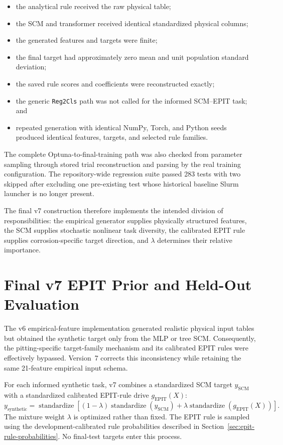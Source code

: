 \documentclass{article}
\begin{document}
\begin{itemize}
    \item the analytical rule received the raw physical table;
    \item the SCM and transformer received identical standardized physical
    columns;
    \item the generated features and targets were finite;
    \item the final target had approximately zero mean and unit population
    standard deviation;
    \item the saved rule scores and coefficients were reconstructed exactly;
    \item the generic \texttt{Reg2Cls} path was not called for the informed
    SCM--EPIT task; and
    \item repeated generation with identical NumPy, Torch, and Python seeds
    produced identical features, targets, and selected rule families.
\end{itemize}

The complete Optuna-to-final-training path was also checked from parameter
sampling through stored trial reconstruction and parsing by the real training
configuration. The repository-wide regression suite passed 283 tests with two
skipped after excluding one pre-existing test whose historical baseline Slurm
launcher is no longer present.

The final v7 construction therefore implements the intended division of
responsibilities: the empirical generator supplies physically structured
features, the SCM supplies stochastic nonlinear task diversity, the calibrated
EPIT rule supplies corrosion-specific target direction, and
\(\lambda\) determines their relative importance.


\section{Final v7 EPIT Prior and Held-Out Evaluation}
\label{sec:final-v7-results}

The v6 empirical-feature implementation generated realistic physical input
tables but obtained the synthetic target only from the MLP or tree SCM.
Consequently, the pitting-specific target-family mechanism and its calibrated
EPIT rules were effectively bypassed. Version~7 corrects this inconsistency
while retaining the same 21-feature empirical input schema.

For each informed synthetic task, v7 combines a standardized SCM target
\(y_{\mathrm{SCM}}\) with a standardized calibrated EPIT-rule drive
\(g_{\mathrm{EPIT}}(X)\):
\[
y_{\mathrm{synthetic}}
=
\operatorname{standardize}
\left[
(1-\lambda)\operatorname{standardize}(y_{\mathrm{SCM}})
+
\lambda\operatorname{standardize}\!\left(g_{\mathrm{EPIT}}(X)\right)
\right].
\]
The mixture weight \(\lambda\) is optimized rather than fixed. The EPIT rule is
sampled using the development-calibrated rule probabilities described in
Section~\ref{sec:epit-rule-probabilities}. No final-test targets enter this
process.
\end{document}
